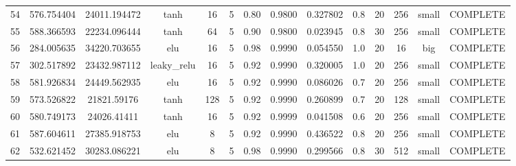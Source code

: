 \begin{longtable}{cccccccccccccc}
                       54 &                 576.754404 &                       24011.194472 &            tanh &          16 &              5 &        0.80 & 0.9800 &       0.327802 &             0.8 &                 20 &      256 &     small & COMPLETE \\
                       55 &                 588.366593 &                       22234.096444 &            tanh &          64 &              5 &        0.90 & 0.9800 &       0.023945 &             0.8 &                 30 &      256 &     small & COMPLETE \\
                       56 &                 284.005635 &                       34220.703655 &             elu &          16 &              5 &        0.98 & 0.9990 &       0.054550 &             1.0 &                 20 &       16 &       big & COMPLETE \\
                       57 &                 302.517892 &                       23432.987112 &     leaky\_relu &          16 &              5 &        0.92 & 0.9990 &       0.320005 &             1.0 &                 20 &      256 &     small & COMPLETE \\
                       58 &                 581.926834 &                       24449.562935 &             elu &          16 &              5 &        0.92 & 0.9990 &       0.086026 &             0.7 &                 20 &      256 &     small & COMPLETE \\
                       59 &                 573.526822 &                        21821.59176 &            tanh &         128 &              5 &        0.92 & 0.9990 &       0.260899 &             0.7 &                 20 &      128 &     small & COMPLETE \\
                       60 &                 580.749173 &                        24026.41411 &            tanh &          16 &              5 &        0.92 & 0.9999 &       0.041508 &             0.6 &                 20 &      256 &     small & COMPLETE \\
                       61 &                 587.604611 &                       27385.918753 &             elu &           8 &              5 &        0.92 & 0.9990 &       0.436522 &             0.8 &                 20 &      256 &     small & COMPLETE \\
                       62 &                 532.621452 &                       30283.086221 &             elu &           8 &              5 &        0.98 & 0.9990 &       0.299566 &             0.8 &                 30 &      512 &     small & COMPLETE \\

\end{longtable}
